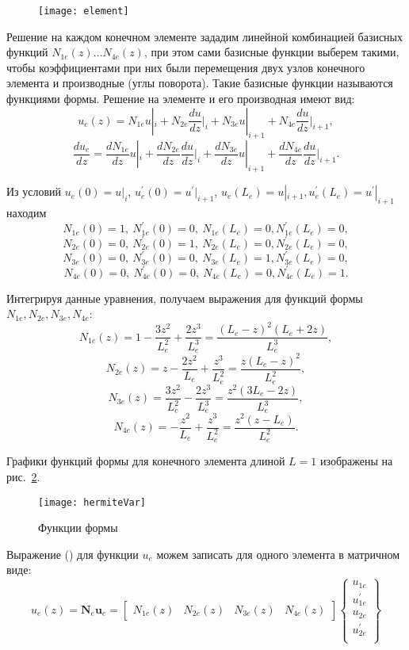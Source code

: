 \documentclass[12pt,a4paper]{article}
\begin{document}
\begin{figure}[H]
		\centering
		\texttt{[image: element]}
		\caption{}
		\label{fig:element}
\end{figure}

Решение на каждом конечном элементе зададим линейной комбинацией базисных функций $N_{1e}(z)\ldots N_{4e}(z)$, при этом сами базисные функции выберем такими, чтобы коэффициентами при них были перемещения двух узлов конечного элемента и производные (углы поворота). Такие базисные функции называются функциями формы. 
Решение на элементе и его производная имеют вид:
	\begin{equation}
	u_e(z)=N_{1e}u|_i + N_{2e}\frac{du}{dz}\Bigr|_i+N_{3e}u|_{i+1} + N_{4e}\frac{du}{dz}\Bigr|_{i+1},
	\label{beam2}
	\end{equation} 
	\begin{equation}
\frac{du_e}{dz}=\frac{dN_{1e}}{dz}u|_i+\frac{dN_{2e}}{dz}\frac{du}{dz}\Bigr|_i+\frac{dN_{3e}}{dz}u|_{i+1}+\frac{dN_{4e}}{dz}\frac{du}{dz}\Bigr|_{i+1}.
	\label{beam3}
	\end{equation} 
	
Из условий $u_e(0)=u|_i$, $u_e^{'}(0)=u^{'}|_{i+1}$, $u_{e}(L_e)=u|_{i+1}, u_{e}^{'}(L_e)=u^{'}|_{i+1}$ находим 
$$N_{1e}(0)=1,~ N_{1e}^{'}(0)=0,~ N_{1e}(L_e)=0,N_{1e}^{'}(L_e)=0,$$ 
$$N_{2e}(0)=0,~ N_{2e}^{'}(0)=1,~ N_{2e}(L_e)=0,N_{2e}^{'}(L_e)=0,$$ 
$$N_{3e}(0)=0,~ N_{3e}^{'}(0)=0,~ N_{3e}(L_e)=1,N_{3e}^{'}(L_e)=0,$$
$$N_{4e}(0)=0,~ N_{4e}^{'}(0)=0,~ N_{4e}(L_e)=0,N_{4e}^{'}(L_e)=1.$$

 Интегрируя данные уравнения, получаем выражения для функций формы $N_{1e},N_{2e},N_{3e},N_{4e}$:
$$N_{1e}(z)=1-\frac{3z^{2}}{L_e^{2}}+\frac{2z^{3}}{L_e^{3}}=\frac{(L_e-z)^2(L_e+2z)}{L_e^3},$$
$$N_{2e}(z)=z-\frac{2z^{2}}{L_e}+\frac{z^{3}}{L_e^{2}}=\frac{z(L_e-z)^{2}}{L_e^{2}},$$
$$N_{3e}(z)=\frac{3z^{2}}{L_e^{2}}-\frac{2z^{3}}{L_e^{3}}=\frac{z^{2}(3L_e-2z)}{L_e^3},$$
$$N_{4e}(z)=-\frac{z^{2}}{L_e}+\frac{z^{3}}{L_e^{2}}=\frac{z^2(z-L_e)}{L_e^{2}}.$$

Графики функций формы для конечного элемента длиной $L=1$ изображены на рис.~\ref{fig:hermite}.

\begin{figure}[H]
		\centering
		\texttt{[image: hermiteVar]}
		\caption{Функции формы}
		\label{fig:hermite}
	\end{figure}

Выражение () для функции $u_{e}$ можем записать для одного элемента в матричном виде:
$$u_e(z)=\textbf{N}_e \textbf{u}_{e}=
\left[
  \begin{array}{cccc}
     N_{1e}(z) & N_{2e}(z) & N_{3e}(z) & N_{4e}(z)
  \end{array}
\right]
\left\{
  \begin{array}{ccc}
    u_{1e}   \\
     u^{'}_{1e}  \\
		u_{2e}\\
		u^{'}_{2e}\\
  \end{array}
\right\}$$
\end{document}

